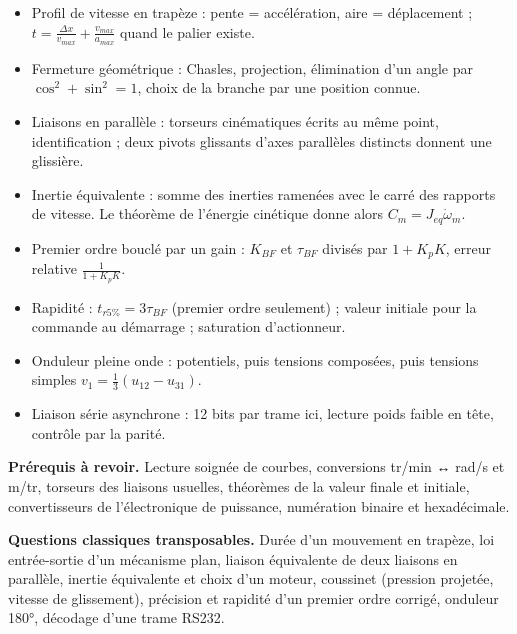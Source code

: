 \documentclass[11pt,a4paper]{article}
\providecommand{\tightlist}{\setlength{\itemsep}{0pt}\setlength{\parskip}{0pt}}
\begin{document}
\begin{itemize}
\tightlist
\item
  Profil de vitesse en trapèze : pente = accélération, aire = déplacement ; \(t=\frac{\Delta x}{v_{max}}+\frac{v_{max}}{a_{max}}\) quand le palier existe.
\item
  Fermeture géométrique : Chasles, projection, élimination d'un angle par \(\cos^2+\sin^2=1\), choix de la branche par une position connue.
\item
  Liaisons en parallèle : torseurs cinématiques écrits au même point, identification ; deux pivots glissants d'axes parallèles distincts donnent une glissière.
\item
  Inertie équivalente : somme des inerties ramenées avec le carré des rapports de vitesse. Le théorème de l'énergie cinétique donne alors \(C_m=J_{eq}\dot\omega_m\).
\item
  Premier ordre bouclé par un gain : \(K_{BF}\) et \(\tau_{BF}\) divisés par \(1+K_pK\), erreur relative \(\frac1{1+K_pK}\).
\item
  Rapidité : \(t_{r5\%}=3\tau_{BF}\) (premier ordre seulement) ; valeur initiale pour la commande au démarrage ; saturation d'actionneur.
\item
  Onduleur pleine onde : potentiels, puis tensions composées, puis tensions simples \(v_1=\frac13(u_{12}-u_{31})\).
\item
  Liaison série asynchrone : 12 bits par trame ici, lecture poids faible en tête, contrôle par la parité.
\end{itemize}

\textbf{Prérequis à revoir.} Lecture soignée de courbes, conversions tr/min ↔ rad/s et m/tr, torseurs des liaisons usuelles, théorèmes de la valeur finale et initiale, convertisseurs de l'électronique de puissance, numération binaire et hexadécimale.

\textbf{Questions classiques transposables.} Durée d'un mouvement en trapèze, loi entrée-sortie d'un mécanisme plan, liaison équivalente de deux liaisons en parallèle, inertie équivalente et choix d'un moteur, coussinet (pression projetée, vitesse de glissement), précision et rapidité d'un premier ordre corrigé, onduleur 180°, décodage d'une trame RS232.
\end{document}
